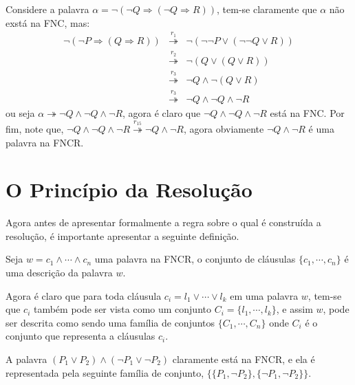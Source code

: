 \begin{exemplo}\label{exe:Reducao1}
  Considere a palavra $\alpha = \neg(\neg Q \Rightarrow (\neg Q \Rightarrow R))$, tem-se claramente que $\alpha$ não exstá na FNC, mas:
  \begin{eqnarray*}
    \neg(\neg P \Rightarrow (Q \Rightarrow R)) & \stackrel{r_1}{\twoheadrightarrow} & \neg(\neg \neg P \lor (\neg \neg Q \lor R)) \\
    & \stackrel{r_2}{\twoheadrightarrow} & \neg(Q \lor (Q \lor R))\\
    & \stackrel{r_3}{\twoheadrightarrow} & \neg Q \land \neg(Q \lor R)\\
    & \stackrel{r_3}{\twoheadrightarrow} & \neg Q \land \neg Q \land \neg R
  \end{eqnarray*}
  ou seja $\alpha \twoheadrightarrow \neg Q \land \neg Q \land \neg R$, agora é claro que $\neg Q \land \neg Q \land \neg R$ está na FNC. Por fim,  note que, $\neg Q \land \neg Q \land \neg R \stackrel{r_{15}}{\twoheadrightarrow} \neg Q \land \neg R$, agora obviamente $\neg Q \land \neg R$ é uma palavra na FNCR.
\end{exemplo}

\section{O Princípio da Resolução}

Agora antes de apresentar formalmente a regra sobre o qual é construída a resolução, é importante apresentar a seguinte definição.

\begin{definicao}
  Seja $w = c_1 \land \cdots \land c_n$ uma palavra na FNCR, o conjunto de cláusulas $\{c_1, \cdots, c_n\}$ é uma descrição da palavra $w$.
\end{definicao}

Agora é claro que para toda cláusula $c_i = l_1 \lor  \cdots \lor l_k$ em uma palavra $w$, tem-se que $c_i$ também pode ser vista como um conjunto $C_i = \{l_1, \cdots, l_k\}$, e assim $w$, pode ser descrita como sendo uma família de conjuntos $\{C_1, \cdots, C_n\}$ onde $C_i$ é o conjunto que representa a cláusulas $c_i$.

\begin{exemplo}
  A palavra $(P_1 \lor P_2) \land (\neg P_1 \lor \neg P_2)$ claramente está na FNCR, e ela é representada pela seguinte família de conjunto, $\{\{P_1, \neg P_2\}, \{\neg P_1, \neg P_2\}\}$.
\end{exemplo}